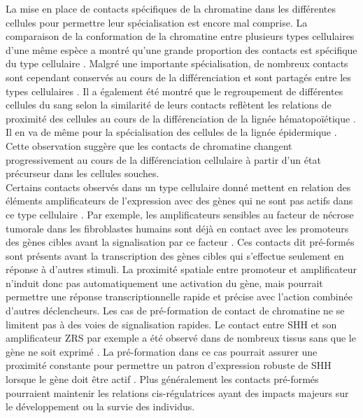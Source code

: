 La mise en place de contacts spécifiques de la chromatine dans les différentes cellules pour permettre leur spécialisation est encore mal comprise. La comparaison de la conformation de la chromatine entre plusieurs types cellulaires d’une même espèce a montré qu’une grande proportion des contacts est spécifique du type cellulaire \citep{javierre_lineage-specific_2016}. Malgré une importante spécialisation, de nombreux contacts sont cependant conservés au cours de la différenciation et sont partagés entre les types cellulaires \citep{freire-pritchett_global_2017, rubin_lineage-specific_2017}. Il a également été montré que le regroupement de différentes cellules du sang selon la similarité de leurs contacts reflètent les relations de proximité des cellules au cours de la différenciation de la lignée hématopoïétique \citep{javierre_lineage-specific_2016}. Il en va de même pour la spécialisation des cellules de la lignée épidermique \citep{rubin_lineage-specific_2017}. Cette observation suggère que les contacts de chromatine changent progressivement au cours de la différenciation cellulaire à partir d'un état précurseur dans les cellules souches. \\

Certains contacts observés dans un type cellulaire donné mettent en relation des éléments \glspl{amplificateur} de l’expression avec des gènes qui ne sont pas actifs dans ce type cellulaire \citep{schoenfelder_pluripotent_2015}. Par exemple, les \glspl{amplificateur} sensibles au facteur de nécrose tumorale dans les fibroblastes humains sont déjà en contact avec les promoteurs des gènes cibles avant la signalisation par ce facteur \citep{jin_high-resolution_2013}. Ces contacts dit pré-formés sont présents avant la transcription des gènes cibles qui s’effectue seulement en réponse à d’autres stimuli. La proximité spatiale entre promoteur et \gls{amplificateur} n’induit donc pas automatiquement une activation du gène, mais pourrait permettre une réponse transcriptionnelle rapide et précise avec l’action combinée d’autres déclencheurs. Les cas de pré-formation de contact de chromatine ne se limitent pas à des voies de signalisation rapides. Le contact entre \acrshort{SHH} et son \gls{amplificateur} \acrshort{ZRS} par exemple a été observé dans de nombreux tissus sans que le gène ne soit exprimé \citep{amano_chromosomal_2009, williamson_shh_2016, ron_promoter-enhancer_2017}. La pré-formation dans ce cas pourrait assurer une proximité constante pour permettre un patron d’expression robuste de \acrshort{SHH} lorsque le gène doit être actif \citep{paliou_preformed_2019}. Plus généralement les contacts pré-formés pourraient maintenir les relations \gls{cis}-régulatrices ayant des impacts majeurs sur le développement ou la survie des individus. 

